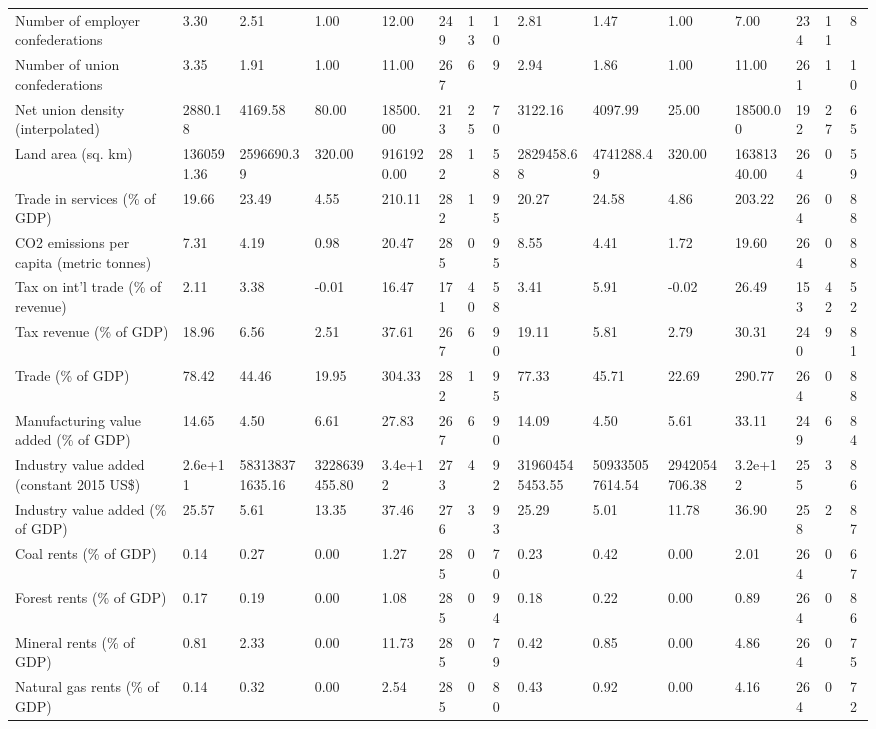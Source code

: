 \begin{longtable}{lllllllllllllll}
Number of employer confederations & 3.30 & 2.51 & 1.00 & 12.00 & 249 & 13 & 10 & 2.81 & 1.47 & 1.00 & 7.00 & 234 & 11 & 8\\
Number of union confederations & 3.35 & 1.91 & 1.00 & 11.00 & 267 & 6 & 9 & 2.94 & 1.86 & 1.00 & 11.00 & 261 & 1 & 10\\
Net union density (interpolated) & 2880.18 & 4169.58 & 80.00 & 18500.00 & 213 & 25 & 70 & 3122.16 & 4097.99 & 25.00 & 18500.00 & 192 & 27 & 65\\
Land area (sq. km) & 1360591.36 & 2596690.39 & 320.00 & 9161920.00 & 282 & 1 & 58 & 2829458.68 & 4741288.49 & 320.00 & 16381340.00 & 264 & 0 & 59\\
\addlinespace
Trade in services (\% of GDP) & 19.66 & 23.49 & 4.55 & 210.11 & 282 & 1 & 95 & 20.27 & 24.58 & 4.86 & 203.22 & 264 & 0 & 88\\
CO2 emissions per capita (metric tonnes) & 7.31 & 4.19 & 0.98 & 20.47 & 285 & 0 & 95 & 8.55 & 4.41 & 1.72 & 19.60 & 264 & 0 & 88\\
Tax on int'l trade (\% of revenue) & 2.11 & 3.38 & -0.01 & 16.47 & 171 & 40 & 58 & 3.41 & 5.91 & -0.02 & 26.49 & 153 & 42 & 52\\
Tax revenue (\% of GDP) & 18.96 & 6.56 & 2.51 & 37.61 & 267 & 6 & 90 & 19.11 & 5.81 & 2.79 & 30.31 & 240 & 9 & 81\\
Trade (\% of GDP) & 78.42 & 44.46 & 19.95 & 304.33 & 282 & 1 & 95 & 77.33 & 45.71 & 22.69 & 290.77 & 264 & 0 & 88\\
\addlinespace
Manufacturing value added (\% of GDP) & 14.65 & 4.50 & 6.61 & 27.83 & 267 & 6 & 90 & 14.09 & 4.50 & 5.61 & 33.11 & 249 & 6 & 84\\
Industry value added (constant 2015 US\$) & 2.6e+11 & 583138371635.16 & 3228639455.80 & 3.4e+12 & 273 & 4 & 92 & 319604545453.55 & 509335057614.54 & 2942054706.38 & 3.2e+12 & 255 & 3 & 86\\
Industry value added (\% of GDP) & 25.57 & 5.61 & 13.35 & 37.46 & 276 & 3 & 93 & 25.29 & 5.01 & 11.78 & 36.90 & 258 & 2 & 87\\
Coal rents (\% of GDP) & 0.14 & 0.27 & 0.00 & 1.27 & 285 & 0 & 70 & 0.23 & 0.42 & 0.00 & 2.01 & 264 & 0 & 67\\
Forest rents (\% of GDP) & 0.17 & 0.19 & 0.00 & 1.08 & 285 & 0 & 94 & 0.18 & 0.22 & 0.00 & 0.89 & 264 & 0 & 86\\
\addlinespace
Mineral rents (\% of GDP) & 0.81 & 2.33 & 0.00 & 11.73 & 285 & 0 & 79 & 0.42 & 0.85 & 0.00 & 4.86 & 264 & 0 & 75\\
Natural gas rents (\% of GDP) & 0.14 & 0.32 & 0.00 & 2.54 & 285 & 0 & 80 & 0.43 & 0.92 & 0.00 & 4.16 & 264 & 0 & 72\\

\end{longtable}
